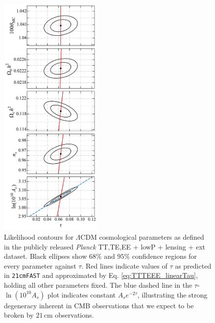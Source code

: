 \documentclass[twocolumn,aps,prd,nofootinbib,showpacs,superscriptaddress]{revtex4-1}
\begin{document}
\begin{figure}[!]
	\centering
	\includegraphics[width=0.45\textwidth]{figures/degenBreaking_planck_TT_TE_EE_lowP_lensing_ext.pdf}
	\caption{Likelihood contours for $\Lambda$CDM cosmological parameters as defined in the publicly released \emph{Planck} TT,TE,EE + lowP + lensing + ext dataset. Black ellipses show $68\%$ and $95\%$ confidence regions for every parameter against $\tau$. Red lines indicate values of $\tau$ as predicted in {\tt 21cmFAST} and approximated by Eq. \eqref{eq:TTTEEE_linearTau}, holding all other parameters fixed. The blue dashed line in the $\tau$-$\ln(10^{10}A_s)$ plot indicates constant $A_s e^{-2\tau}$, illustrating the strong degeneracy inherent in CMB observations that we expect to be broken by $21\,\textrm{cm}$ observations.}
	\label{fig:degenBreaking}
\end{figure}
\end{document}
